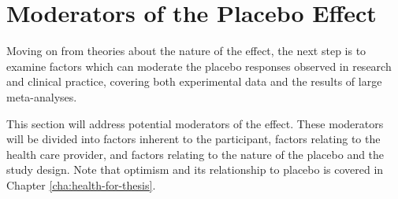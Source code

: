 

\section{Moderators of the Placebo Effect}
\label{sec:moder-plac-effect}

Moving on from theories about the nature of the effect, the next step is to examine factors which can moderate the placebo responses observed in research and clinical practice, covering both experimental data and the results of large meta-analyses. 


This section will address potential moderators of the effect.
These moderators will be divided into factors inherent to the participant, factors relating to the health care provider, and factors relating to the nature of the placebo and the study design. Note that optimism and its relationship to placebo is covered in Chapter \ref{cha:health-for-thesis}.





